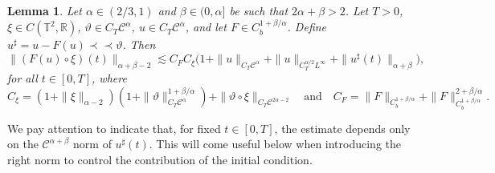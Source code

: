 \documentclass[11pt,a4paper]{article}
\newcommand{\precprec}{\prec\!\!\!\prec}
\newtheorem{lemma}[theorem]{Lemma}
\theoremstyle{remark}
\newcommand{\R}{\mathbb{R}}
\newcommand{\CC}{\ensuremath{\mathscr{C}}}
\begin{document}
\begin{lemma}\label{lem:pam circ apriori}
   Let $\alpha \in (2/3, 1)$ and $\beta \in (0,\alpha]$ be such that $2\alpha + \beta > 2$. Let $T>0$, $\xi \in C(\mathbb{T}^2, \R)$, $\vartheta \in C_T\CC^\alpha$, $u \in C_T \CC^\alpha$, and let $F \in C^{1+\beta/\alpha}_{b}$. Define $u^\sharp = u - F(u) \precprec \vartheta$. Then
  \[
     \|(F(u) \circ \xi) (t) \|_{\alpha+\beta-2} \lesssim C_F C_\xi \big( 1 + \|u\|_{C_T\CC^\alpha} + \|u\|_{C^{\alpha/2}_TL^\infty} + \|u^\sharp (t)\|_{\alpha+\beta} \big),
  \]
  for all $t \in [0,T]$, where
  \begin{equation}\label{eq:pam Cxi CF}
     C_{\xi} = (1+\| \xi \|_{\alpha -2}) ( 1 + \| \vartheta \|_{C_{T} \CC^\alpha}^{1+\beta/\alpha}) + \| \vartheta \circ   \xi \|_{C_{T} \CC^{2 \alpha -2}} \quad \text{and} \quad C_{F} = \| F \|_{C^{1+\beta/\alpha}_{b}}+\| F \|_{C^{1+\beta/\alpha}_{b}}^{2+\beta/\alpha}.
  \end{equation}
\end{lemma}

We pay attention to indicate that, for fixed $t \in [ 0,T ]$, the
estimate depends only on the $\CC^{\alpha + \beta}$ norm of
$u^{\sharp} ( t )$. This will come useful below when introducing the right
norm to control the contribution of the initial condition.
\end{document}
